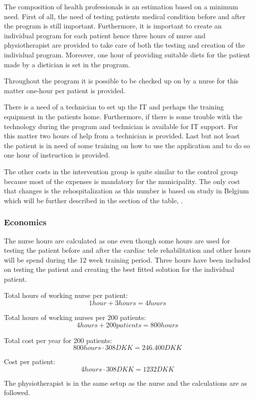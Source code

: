 The composition of health professionals is an estimation based on a minimum need.  First of all, the need of testing patients medical condition before and after the program is still important. Furthermore, it is important to create an individual program for each patient hence three hours of nurse and physiotherapist are provided to take care of both the testing and creation of the individual program. Moreover, one hour of providing suitable diets for the patient made by a dietician is set in the program.
 
Throughout the program it is possible to be checked up on by a nurse for this matter one-hour per patient is provided. 

There is a need of a technician to set up the IT and perhaps the training equipment in the patients home. Furthermore, if there is some trouble with the technology during the program and technician is available for IT support. For this matter two hours of help from a technician is provided. Last but not least the patient is in need of some training on how to use the application and to do so one hour of instruction is provided. 

The other costs in the intervention group is quite similar to the control group because most of the expenses is mandatory for the municipality. The only cost that changes is the rehospitalization as this number is based on study in Belgium \cite{costeffect} which will be further described in the section of the table, . 

\subsubsection{Economics}

The nurse hours are calculated as one even though some hours are used for testing the patient before and after the cardiac tele rehabilitation and other hours will be spend during the 12 week training period. Three hours have been included on testing the patient and creating the best fitted solution for the individual patient.

Total hours of working nurse per patient:
$$1hour + 3hours=4hours$$

Total hours of working nurses per 200 patients:
$$4hours + 200patients=800hours$$

Total cost per year for 200 patients:
$$800hours\cdot308DKK= 246.400DKK$$

Cost per patient:
$$4hours \cdot 308DKK=1232DKK$$

The physiotherapist is in the same setup as the nurse and the calculations are as followed.

